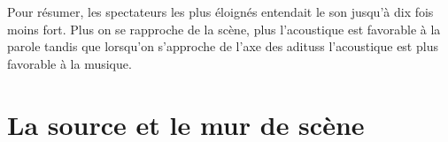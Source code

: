 
Pour résumer, les spectateurs les plus éloignés entendait le son jusqu'à dix fois moins fort. Plus on se rapproche de la scène, plus l'acoustique est favorable à la parole tandis que lorsqu'on s'approche de l'axe des \glspl{aditus} l'acoustique est plus favorable à la musique.

\section{La source et le mur de scène}

